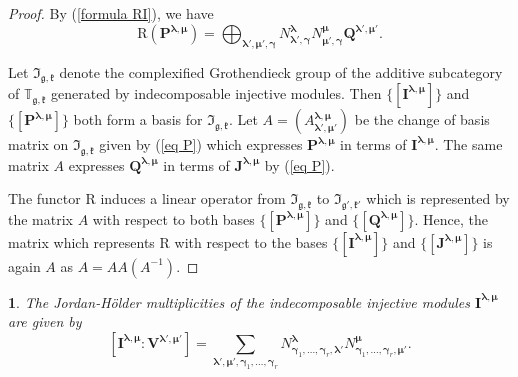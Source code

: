\documentclass[12pt,oneside,english]{amsart}
\numberwithin{equation}{section}
\numberwithin{figure}{section}
\theoremstyle{plain}
\theoremstyle{plain}
\theoremstyle{remark}
\theoremstyle{definition}
\theoremstyle{plain}
\theoremstyle{remark}
\theoremstyle{definition}
\theoremstyle{plain}
\newtheorem{cor}[thm]{\protect\corollaryname}
\theoremstyle{plain}
\theoremstyle{definition}
\providecommand{\corollaryname}{Corollary}
\newcommand{\bP}{\mathbf{P}}
\newcommand{\bV}{\mathbf{V}}
\newcommand{\bJ}{\mathbf{J}}
\newcommand{\bI}{\mathbf{I}}
\newcommand{\bQ}{\mathbf{Q}}
\newcommand{\fg}{\mathfrak{g}}
\newcommand{\fk}{\mathfrak{k}}
\begin{document}
\begin{proof}
By (\ref{formula RI}), we have
$$
\mathrm{R}(\bP^{\boldsymbol{\lambda},{\boldsymbol{\mu}}})=\bigoplus_{\boldsymbol{\lambda'},\boldsymbol{\mu'},{\boldsymbol{\gamma}}}  N_{\boldsymbol{\lambda}',{\boldsymbol{\gamma}}}^{\boldsymbol{\lambda}} N_{{\boldsymbol{\mu}}',{\boldsymbol{\gamma}}}^{{\boldsymbol{\mu}}}  \bQ^{\boldsymbol{\lambda}',{\boldsymbol{\mu}}'}.
$$

Let $\mathfrak{I}_{\fg,\fk}$ denote the complexified Grothendieck group of the additive subcategory of $\mathbb T_{\fg,\fk}$  generated by indecomposable injective modules. Then $\{[\bI^{\boldsymbol{\lambda},{\boldsymbol{\mu}}}]\}$ and  $\{[\bP^{\boldsymbol{\lambda},{\boldsymbol{\mu}}}]\}$ both form a basis for  $\mathfrak{I}_{\fg,\fk}$. Let $A=(A_{\boldsymbol{\lambda}',{\boldsymbol{\mu}}'}^{\boldsymbol{\lambda},{\boldsymbol{\mu}}})$ be the change of basis matrix on $\mathfrak{I}_{\fg,\fk}$ given by (\ref{eq P}) which expresses $\bP^{\boldsymbol{\lambda},{\boldsymbol{\mu}}}$ in terms of $\bI^{\boldsymbol{\lambda},{\boldsymbol{\mu}}}$. The same matrix $A$ expresses  $\bQ^{\boldsymbol{\lambda},{\boldsymbol{\mu}}}$ in terms of $\bJ^{\boldsymbol{\lambda},{\boldsymbol{\mu}}}$ by (\ref{eq P}).

The functor $\mathrm{R}$ induces a linear operator from $\mathfrak{I}_{\fg,\fk}$ to $\mathfrak{I}_{\fg',\fk'}$ which is represented by the matrix $A$ with respect to both bases $\{[\bP^{\boldsymbol{\lambda},{\boldsymbol{\mu}}}]\}$ and $\{[\bQ^{\boldsymbol{\lambda},{\boldsymbol{\mu}}}]\}$. Hence, the  matrix which represents $\mathrm{R}$ with respect to the bases  $\{[\bI^{\boldsymbol{\lambda},{\boldsymbol{\mu}}}]\}$ and $\{[\bJ^{\boldsymbol{\lambda},{\boldsymbol{\mu}}}]\}$ is again $A$ as $A=AA(A^{-1})$.
\end{proof}

  \begin{cor}\label{cor:JHmultiplicities} The Jordan-H\"older multiplicities of the indecomposable injective modules $\bI^{\boldsymbol{\lambda},{\boldsymbol{\mu}}}$ are given by
    $$[\bI^{\boldsymbol{\lambda},{\boldsymbol{\mu}}}:\bV^{\boldsymbol{\lambda}',{\boldsymbol{\mu}}'}]=\sum_{\boldsymbol{\lambda'},\boldsymbol{\mu'},{\boldsymbol{\gamma}}_1,\dots,{\boldsymbol{\gamma}}_r}N^{\boldsymbol{\lambda}}_{{\boldsymbol{\gamma}}_1,\dots,{\boldsymbol{\gamma}}_r,\boldsymbol{\lambda}'}N^{{\boldsymbol{\mu}}}_{{\boldsymbol{\gamma}}_1,\dots,{\boldsymbol{\gamma}}_r,{\boldsymbol{\mu}}'}.$$

    \end{cor}
\end{document}
